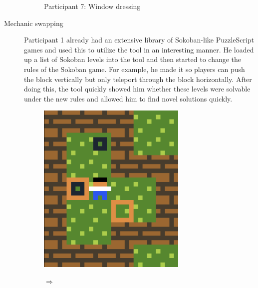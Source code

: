 \begin{description}
\begin{figure}[!htbp]
\begin{minipage}[t]{0.25\textwidth}
\end{minipage}
\caption{Participant 7: Window dressing\label{fig:windowdressing}}
\end{figure}
    

\item[Mechanic swapping] Participant 1 already had an extensive library of Sokoban-like PuzzleScript games and used this to utilize the tool in an interesting manner. He loaded up a list of Sokoban levels into the tool and then started to change the rules of the Sokoban game. For example, he made it so players can push the block vertically but only teleport through the block horizontally. After doing this, the tool quickly showed him whether these levels were solvable under the new rules and allowed him to find novel solutions quickly.

\begin{figure}[!htbp]
\begin{minipage}{0.5\textwidth}
\centering
\includegraphics[width=0.7\textwidth]{figures/rulebasedimprovingfrom.png}
\end{minipage}  $\Longrightarrow$ \hfill
\begin{minipage}{0.5\textwidth}
\centering

\end{minipage}
\end{figure}
\end{description}
